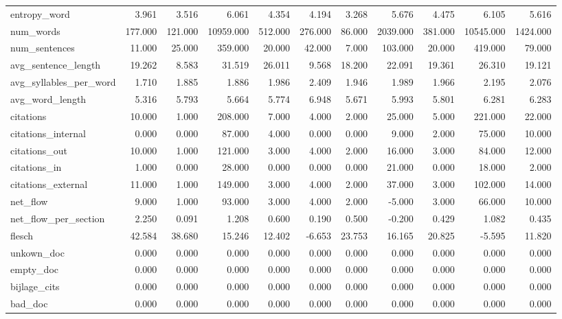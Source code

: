 \begin{tabular}{lrrrrrrrrrr}
\cline{1-11}
entropy\_word & 3.961 & 3.516 & 6.061 & 4.354 & 4.194 & 3.268 & 5.676 & 4.475 & 6.105 & 5.616 \\
\cline{1-11}
num\_words & 177.000 & 121.000 & 10959.000 & 512.000 & 276.000 & 86.000 & 2039.000 & 381.000 & 10545.000 & 1424.000 \\
\cline{1-11}
num\_sentences & 11.000 & 25.000 & 359.000 & 20.000 & 42.000 & 7.000 & 103.000 & 20.000 & 419.000 & 79.000 \\
\cline{1-11}
avg\_sentence\_length & 19.262 & 8.583 & 31.519 & 26.011 & 9.568 & 18.200 & 22.091 & 19.361 & 26.310 & 19.121 \\
\cline{1-11}
avg\_syllables\_per\_word & 1.710 & 1.885 & 1.886 & 1.986 & 2.409 & 1.946 & 1.989 & 1.966 & 2.195 & 2.076 \\
\cline{1-11}
avg\_word\_length & 5.316 & 5.793 & 5.664 & 5.774 & 6.948 & 5.671 & 5.993 & 5.801 & 6.281 & 6.283 \\
\cline{1-11}
citations & 10.000 & 1.000 & 208.000 & 7.000 & 4.000 & 2.000 & 25.000 & 5.000 & 221.000 & 22.000 \\
\cline{1-11}
citations\_internal & 0.000 & 0.000 & 87.000 & 4.000 & 0.000 & 0.000 & 9.000 & 2.000 & 75.000 & 10.000 \\
\cline{1-11}
citations\_out & 10.000 & 1.000 & 121.000 & 3.000 & 4.000 & 2.000 & 16.000 & 3.000 & 84.000 & 12.000 \\
\cline{1-11}
citations\_in & 1.000 & 0.000 & 28.000 & 0.000 & 0.000 & 0.000 & 21.000 & 0.000 & 18.000 & 2.000 \\
\cline{1-11}
citations\_external & 11.000 & 1.000 & 149.000 & 3.000 & 4.000 & 2.000 & 37.000 & 3.000 & 102.000 & 14.000 \\
\cline{1-11}
net\_flow & 9.000 & 1.000 & 93.000 & 3.000 & 4.000 & 2.000 & -5.000 & 3.000 & 66.000 & 10.000 \\
\cline{1-11}
net\_flow\_per\_section & 2.250 & 0.091 & 1.208 & 0.600 & 0.190 & 0.500 & -0.200 & 0.429 & 1.082 & 0.435 \\
\cline{1-11}
flesch & 42.584 & 38.680 & 15.246 & 12.402 & -6.653 & 23.753 & 16.165 & 20.825 & -5.595 & 11.820 \\
\cline{1-11}
unkown\_doc & 0.000 & 0.000 & 0.000 & 0.000 & 0.000 & 0.000 & 0.000 & 0.000 & 0.000 & 0.000 \\
\cline{1-11}
empty\_doc & 0.000 & 0.000 & 0.000 & 0.000 & 0.000 & 0.000 & 0.000 & 0.000 & 0.000 & 0.000 \\
\cline{1-11}
bijlage\_cits & 0.000 & 0.000 & 0.000 & 0.000 & 0.000 & 0.000 & 0.000 & 0.000 & 0.000 & 0.000 \\
\cline{1-11}
bad\_doc & 0.000 & 0.000 & 0.000 & 0.000 & 0.000 & 0.000 & 0.000 & 0.000 & 0.000 & 0.000 \\
\cline{1-11}
\bottomrule
\end{tabular}
